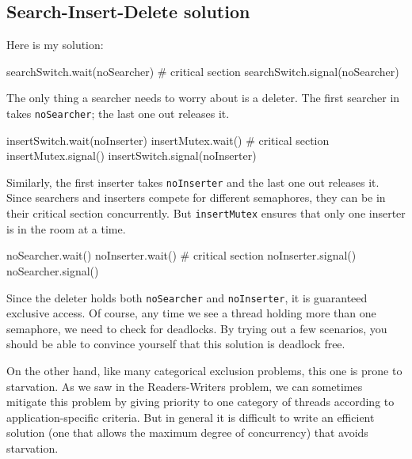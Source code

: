 \documentclass{book}
\begin{document}
\subsection{Search-Insert-Delete solution}

Here is my solution:

\begin{unbreakable}[title={Search-Insert-Delete solution (searcher)}]{}
searchSwitch.wait(noSearcher)
# critical section
searchSwitch.signal(noSearcher)
\end{unbreakable}

The only thing a searcher needs to worry about is a deleter.
The first searcher in takes {\tt noSearcher}; the last one out
releases it.

\begin{unbreakable}[title={Search-Insert-Delete solution (inserter)}]{}
insertSwitch.wait(noInserter)
insertMutex.wait()
# critical section
insertMutex.signal()
insertSwitch.signal(noInserter)
\end{unbreakable}

Similarly, the first inserter takes {\tt noInserter} and the last one
out releases it.  Since searchers and inserters compete for different
semaphores, they can be in their critical section concurrently.
But {\tt insertMutex} ensures that only one inserter is in the room
at a time.

\begin{unbreakable}[title={Search-Insert-Delete solution (deleter)}]{}
noSearcher.wait()
noInserter.wait()
# critical section
noInserter.signal()
noSearcher.signal()

\end{unbreakable}

Since the deleter holds both {\tt noSearcher} and {\tt noInserter},
it is guaranteed exclusive access.  Of course, any time we see
a thread holding more than one semaphore, we need to check for
deadlocks.  By trying out a few scenarios, you should be able
to convince yourself that this solution is deadlock free.

On the other hand, like many categorical exclusion problems, this
one is prone to starvation.  As we saw in the Readers-Writers problem,
we can sometimes mitigate this problem by giving priority to one
category of threads according to application-specific criteria.
But in general it is difficult to write an efficient solution
(one that allows the maximum degree of concurrency)
that avoids starvation.
\end{document}
